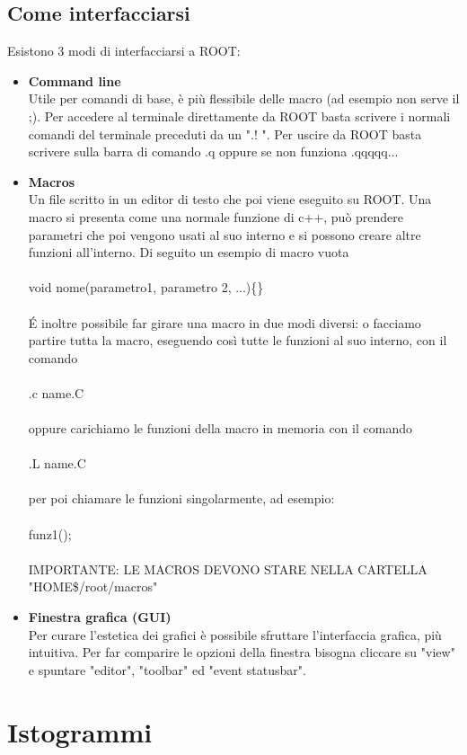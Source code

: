 \documentclass[10pt,a4paper]{article}
\begin{document}
\subsection{Come interfacciarsi}
Esistono 3 modi di interfacciarsi a ROOT: 
\begin{itemize}
\item \textbf{Command line}\\
Utile per comandi di base, è più flessibile delle macro (ad esempio non serve il ;). Per accedere al terminale direttamente da ROOT basta scrivere i normali comandi del terminale preceduti da un ".! ". Per uscire da ROOT basta scrivere sulla barra di comando .q oppure se non funziona .qqqqq...
\item \textbf{Macros}\\
Un file scritto in un editor di testo che poi viene eseguito su ROOT. Una macro si presenta come una normale funzione di c++, può prendere parametri che poi vengono usati al suo interno e si possono creare altre funzioni all'interno. Di seguito un esempio di macro vuota\\\\
void nome(parametro1, parametro 2, ...)\{\}\\\\
\'{E} inoltre possibile far girare una macro in due modi diversi: o facciamo partire tutta la macro, eseguendo così tutte le funzioni al suo interno, con il comando\\\\
.c name.C\\\\
oppure carichiamo le funzioni della macro in memoria con il comando\\\\
.L name.C\\\\
per poi chiamare le funzioni singolarmente, ad esempio:\\\\
funz1();\\\\
IMPORTANTE: LE MACROS DEVONO STARE NELLA CARTELLA "HOME\$/root/macros"
\item \textbf{Finestra grafica (GUI)}\\
Per curare l'estetica dei grafici è possibile sfruttare l'interfaccia grafica, più intuitiva. Per far comparire le opzioni della finestra bisogna cliccare su "view" e spuntare "editor", "toolbar" ed "event statusbar". 
\end{itemize}
\section{Istogrammi}
\end{document}
